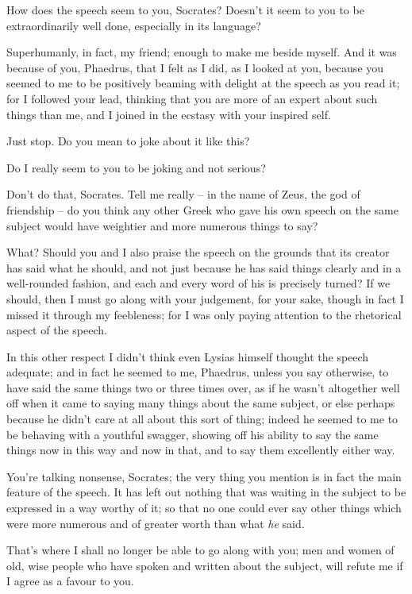 How does the speech seem to you, Socrates? Doesn't it seem to you to be
extraordinarily well done, especially in its language?

Superhumanly, in fact, my friend; enough to make  me
beside myself. And it was because of you, Phaedrus, that I felt as I
did, as I looked at you, because you seemed to me to be positively
beaming with delight at the speech as you read it; for I followed your
lead, thinking that you are more of an  expert about such things
than me, and I joined in the ecstasy with your
inspired self.

Just stop. Do you mean to joke about it like this?

Do I really seem to you to be joking and not serious?

Don't do that, Socrates. Tell me really -- in the name 
of Zeus, the god of friendship -- do you think any other Greek who gave
his own speech on the same subject would have weightier and more
numerous things to say?

 What? Should you and I also praise the speech on the
grounds that its creator
has said what he should, and not just because he has said things clearly
and in a well-rounded fashion, and each and every word of his is
precisely turned? If we should, then I must go along with your
judgement, for your  sake, though in fact I missed
it through my feebleness;
for I was only paying attention to the rhetorical aspect of the speech.

In this other respect I didn't think even Lysias himself thought the
speech adequate; and in fact he seemed to me, Phaedrus, unless you say
otherwise, to have said the same things two or  three times
over, as if he wasn't altogether well off when it came to saying many
things about the same subject, or else perhaps because he didn't care at
all about this sort of thing; indeed he seemed to me to be behaving with
a youthful swagger, showing off his ability to say the same things now
in this way and now in that, and to say them excellently either way.

 You're talking nonsense, Socrates; the very thing you
mention is in fact the main feature of the speech. It has left out
nothing that was waiting in the subject to be expressed in a way worthy
of it; so that no one could ever say other things  which were
more numerous and of greater worth than what {\em he} said.

That's where I shall no longer be able to go along with you;
men and women of old, wise people who have spoken and written about the
subject, will refute me if I agree as a favour to you.

